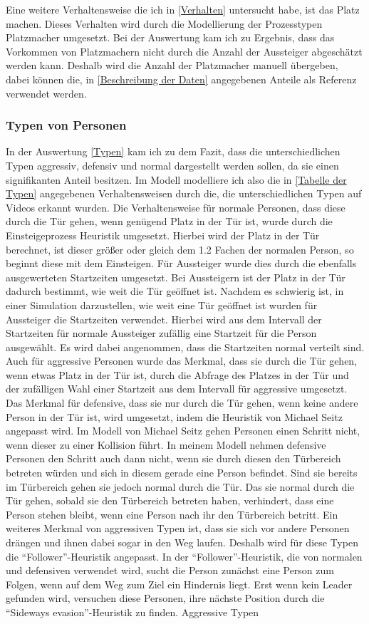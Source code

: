 Eine weitere Verhaltensweise die ich in \ref{Verhalten} untersucht habe, ist das Platz machen. Dieses Verhalten wird durch die Modellierung der Prozesstypen Platzmacher umgesetzt. Bei der Auswertung kam ich zu Ergebnis, dass das Vorkommen von Platzmachern nicht durch die Anzahl der Aussteiger abgeschätzt werden kann. Deshalb wird die Anzahl der Platzmacher manuell übergeben, dabei können die, in \ref{Beschreibung der Daten} angegebenen Anteile als Referenz verwendet werden.
\subsubsection{Typen von Personen}
In der Auswertung \ref{Typen} kam ich zu dem Fazit, dass die unterschiedlichen Typen aggressiv, defensiv und normal dargestellt werden sollen, da sie einen signifikanten Anteil besitzen. Im Modell modelliere ich also die in \ref{Tabelle der Typen} angegebenen Verhaltensweisen durch die, die unterschiedlichen Typen auf Videos erkannt wurden. Die Verhaltensweise für normale Personen, dass diese durch die Tür gehen, wenn genügend Platz in der Tür ist, wurde durch die Einsteigeprozess Heuristik umgesetzt. Hierbei wird der Platz in der Tür berechnet, ist dieser größer oder gleich dem 1.2 Fachen der normalen Person, so beginnt diese mit dem Einsteigen. Für Aussteiger wurde dies durch die ebenfalls ausgewerteten Startzeiten umgesetzt. Bei Aussteigern ist der Platz in der Tür dadurch bestimmt, wie weit die Tür geöffnet ist. Nachdem es schwierig ist, in einer Simulation darzustellen, wie weit eine Tür geöffnet ist wurden für Aussteiger die Startzeiten verwendet. Hierbei wird aus dem Intervall der Startzeiten für normale Aussteiger zufällig eine Startzeit für die Person ausgewählt. Es wird dabei angenommen, dass die Startzeiten normal verteilt sind. Auch für aggressive Personen wurde das Merkmal, dass sie durch die Tür gehen, wenn etwas Platz in der Tür ist, durch die Abfrage des Platzes in der Tür und der zufälligen Wahl einer Startzeit aus dem Intervall für aggressive umgesetzt. Das Merkmal für defensive, dass sie nur durch die Tür gehen, wenn keine andere Person in der Tür ist, wird umgesetzt, indem die Heuristik von Michael Seitz angepasst wird. Im Modell von Michael Seitz gehen Personen einen Schritt nicht, wenn dieser zu einer Kollision führt. In meinem Modell nehmen defensive Personen den Schritt auch dann nicht, wenn sie durch diesen den Türbereich betreten würden und sich in diesem gerade eine Person befindet. Sind sie bereits im Türbereich gehen sie jedoch normal durch die Tür. Das sie normal durch die Tür gehen, sobald sie den Türbereich betreten haben, verhindert, dass eine Person stehen bleibt, wenn eine Person nach ihr den Türbereich betritt. Ein weiteres Merkmal von aggressiven Typen ist, dass sie sich vor andere Personen drängen und ihnen dabei sogar in den Weg laufen. Deshalb wird für diese Typen die "`Follower"'-Heuristik angepasst. In der "`Follower"'-Heuristik, die von normalen und defensiven verwendet wird, sucht die Person zunächst eine Person zum Folgen, wenn auf dem Weg zum Ziel ein Hindernis liegt. Erst wenn kein Leader gefunden wird, versuchen diese Personen, ihre nächste Position durch die "`Sideways evasion"'-Heuristik zu finden. Aggressive Typen 
